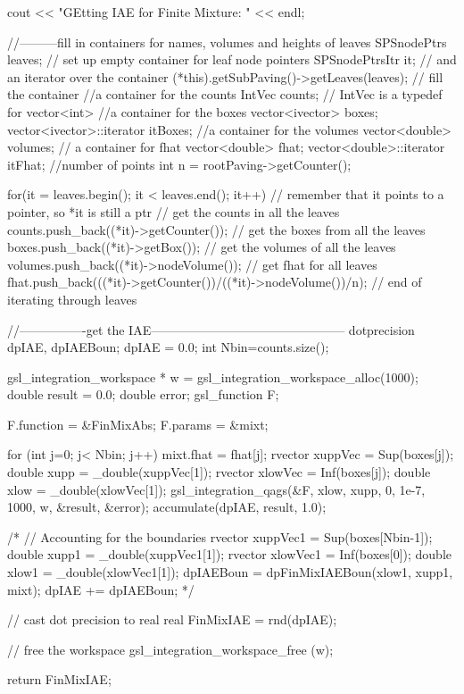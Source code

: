 \begin{DoxyCode}
{
  cout << "GEtting IAE for Finite Mixture: " << endl; 

  //---------fill in containers for names, volumes and heights of leaves
  SPSnodePtrs leaves; // set up empty container for leaf node pointers
  SPSnodePtrsItr it; // and an iterator over the container
  (*this).getSubPaving()->getLeaves(leaves); // fill the container
  //a container for the counts
  IntVec counts;  // IntVec is a typedef for vector<int>
  //a container for the boxes
  vector<ivector> boxes; vector<ivector>::iterator itBoxes;
  //a container for the volumes
  vector<double> volumes;
  // a container for fhat
  vector<double> fhat; vector<double>::iterator itFhat;
  //number of points
  int n = rootPaving->getCounter();
            
  for(it = leaves.begin(); it < leaves.end(); it++) {
    // remember that it points to a pointer, so *it is still a ptr
    // get the counts in all the leaves
     counts.push_back((*it)->getCounter());
     // get the boxes from all the leaves
     boxes.push_back((*it)->getBox());
     // get the volumes of all the leaves
     volumes.push_back((*it)->nodeVolume());
     // get fhat for all leaves
     fhat.push_back(((*it)->getCounter())/((*it)->nodeVolume())/n);
  } // end of iterating through leaves 
  
  //----------------get the IAE-----------------------------------------------
  dotprecision dpIAE, dpIAEBoun;
  dpIAE = 0.0;
  int Nbin=counts.size();
  
  gsl_integration_workspace * w = gsl_integration_workspace_alloc(1000);
  double result = 0.0;
  double error;
  gsl_function F;
  
  F.function = &FinMixAbs;
  F.params =  &mixt;
  
  for (int j=0; j< Nbin; j++){
    mixt.fhat = fhat[j];
    rvector xuppVec = Sup(boxes[j]);
    double xupp = _double(xuppVec[1]);
    rvector xlowVec = Inf(boxes[j]);
    double xlow = _double(xlowVec[1]);
    gsl_integration_qags(&F, xlow, xupp, 0, 1e-7, 1000, w, &result, &error);
    accumulate(dpIAE, result, 1.0);
  }
  
  /*
  // Accounting for the boundaries
  rvector xuppVec1 = Sup(boxes[Nbin-1]);
  double xupp1 = _double(xuppVec1[1]);
  rvector xlowVec1 = Inf(boxes[0]);
  double xlow1 = _double(xlowVec1[1]);
  dpIAEBoun = dpFinMixIAEBoun(xlow1, xupp1, mixt);
  dpIAE += dpIAEBoun;
  */
  
  // cast dot precision to real
  real FinMixIAE = rnd(dpIAE);
  
  // free the workspace
  gsl_integration_workspace_free (w);
  
  return FinMixIAE;
}
\end{DoxyCode}
